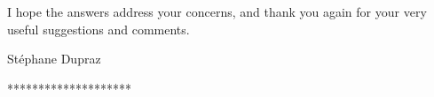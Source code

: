 \documentclass[11pt]{article}
\begin{document}
\medskip

I hope the answers address your concerns, and thank you again for your very useful suggestions and comments.

\bigskip

St\'{e}phane Dupraz

\bigskip
\bigskip
  \begin{center}
  ********************
  \end{center}
\bigskip
\bigskip

{\baselineskip=14pt
	
	}
\end{document}
